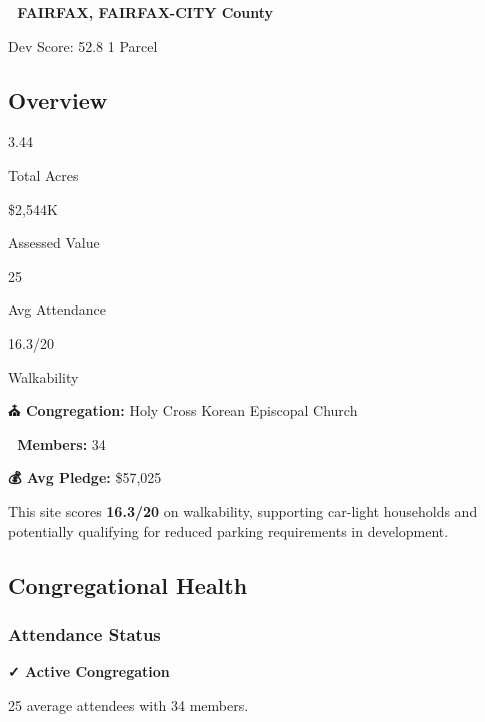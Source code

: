 \documentclass[
  letterpaper,
  DIV=11,
  numbers=noendperiod,
  oneside]{scrreprt}
\begin{document}

\textbf{📍 FAIRFAX, FAIRFAX-CITY County}

{Dev Score: 52.8} {1 Parcel}

\subsection{Overview}

{3.44}

{Total Acres}

{\$2,544K}

{Assessed Value}

{25}

{Avg Attendance}

{16.3/20}

{Walkability}

\textbf{⛪ Congregation:} Holy Cross Korean Episcopal Church

\textbf{👥 Members:} 34

\textbf{💰 Avg Pledge:} \$57,025

\begin{tcolorbox}[enhanced jigsaw, bottomtitle=1mm, left=2mm, rightrule=.15mm, colbacktitle=quarto-callout-tip-color!10!white, arc=.35mm, title=\textcolor{quarto-callout-tip-color}{\faLightbulb}\hspace{0.5em}{🚶 Highly Walkable Location}, bottomrule=.15mm, colback=white, colframe=quarto-callout-tip-color-frame, leftrule=.75mm, titlerule=0mm, opacitybacktitle=0.6, breakable, coltitle=black, toptitle=1mm, toprule=.15mm, opacityback=0]

This site scores \textbf{16.3/20} on walkability, supporting car-light
households and potentially qualifying for reduced parking requirements
in development.

\end{tcolorbox}

\subsection{Congregational Health}

\subsubsection{Attendance Status}\label{attendance-status-7}

\textbf{✓ Active Congregation}

25 average attendees with 34 members.
\end{document}
